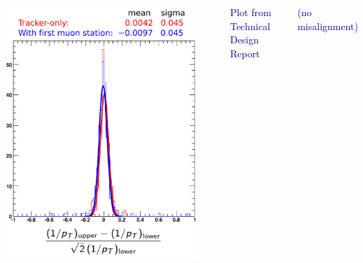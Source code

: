 \documentclass[compress]{beamer}
\begin{document}
\begin{frame}
\begin{columns}
\begin{center}
\includegraphics[width=\linewidth]{with_alignment.pdf}
\end{center}

\mbox{ }

\vspace{0.15 cm}
\scriptsize \centering \textcolor{darkblue}{Plot from Technical Design Report}

\textcolor{darkblue}{(no misalignment)}


\end{columns}
\end{frame}
\end{document}
